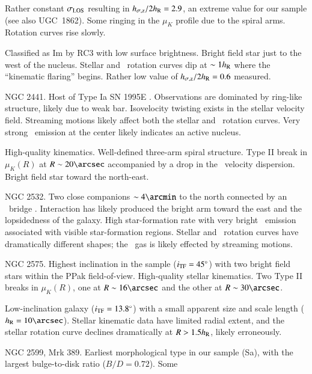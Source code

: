 \documentclass[traditabstract]{aa} %
\begin{document}
\begin{list}{}
  Rather constant $\sigma_{\rm LOS}$ resulting in $h_{\sigma{\rm,z}}/2h_{\rm R} = 2.9$, an extreme value for
  our sample (see also UGC~1862).  Some ringing in the $\mu_K$ profile due to
  the spiral arms.  Rotation curves rise slowly.
%
  \item[{\bf UGC  3997:}] Classified as Im by RC3 with low surface brightness.
  Bright field star just to the west of the nucleus.  Stellar and \oiii\
  rotation curves dip at $\sim1h_{\rm R}$ where the ``kinematic flaring'' begins.
  Rather low value of $h_{\sigma{\rm,z}}/2h_{\rm R}=0.6$ measured.
%
  \item[{\bf UGC  4036:}] NGC 2441.  Host of Type Ia SN 1995E
  \citep{molaro1995, quinn2006}.  Observations are dominated
  by ring-like structure, likely due to weak bar.  Isovelocity twisting exists
  in the stellar velocity field.  Streaming motions likely affect both the
  stellar and \oiii\ rotation curves.  Very strong \oiii\ emission at the center
  likely indicates an active nucleus.
%
  \item[{\bf UGC  4107:}] High-quality kinematics.  Well-defined three-arm
  spiral structure.  Type II break in $\mu_K(R)$ at $R\sim20\arcsec$ accompanied
  by a drop in the \oiii\ velocity dispersion.  Bright field star toward the
  north-east.
%
  \item[{\bf UGC  4256:}] NGC 2532.  Two close companions $\sim4\arcmin$ to the
  north connected by an \hone\ bridge \citep{martinsson2011}.  Interaction has
  likely produced the bright arm toward the east and the lopsidedness of the
  galaxy.  High star-formation rate with very bright \oiii\ emission associated
  with visible star-formation regions.  Stellar and \oiii\ rotation curves have
  dramatically different shapes; the \oiii\ gas is likely effected by streaming
  motions.
%
  \item[{\bf UGC  4368:}] NGC 2575. Highest inclination in the sample
  ($i_{\rm TF}=45\mbox{$^\circ$}$) with two bright field stars within the PPak field-of-view.
  High-quality stellar kinematics.  Two Type II breaks in $\mu_K(R)$, one at
  $R\sim16\arcsec$ and the other at $R\sim30\arcsec$.
%
  \item[{\bf UGC  4380:}]  Low-inclination galaxy ($i_{\rm TF}=13.8\mbox{$^\circ$}$) with a
  small apparent size and scale length ($\hr=10\arcsec$).  Stellar kinematic
  data have limited radial extent, and the stellar rotation curve declines
  dramatically at $R>1.5h_{\rm R}$, likely erroneously.
%
  \item[{\bf UGC  4458:}]  NGC 2599, Mrk 389.  Earliest morphological type in
  our sample (Sa), with the largest bulge-to-disk ratio ($B/D = 0.72$).  Some

\end{list}
\end{document}
